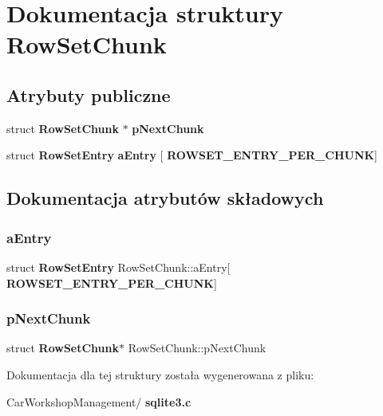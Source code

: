 \section{Dokumentacja struktury Row\+Set\+Chunk}
\label{struct_row_set_chunk}
\subsection*{Atrybuty publiczne}
\begin{DoxyCompactItemize}
\item 
struct \textbf{ Row\+Set\+Chunk} $\ast$ \textbf{ p\+Next\+Chunk}
\item 
struct \textbf{ Row\+Set\+Entry} \textbf{ a\+Entry} [\textbf{ R\+O\+W\+S\+E\+T\+\_\+\+E\+N\+T\+R\+Y\+\_\+\+P\+E\+R\+\_\+\+C\+H\+U\+NK}]
\end{DoxyCompactItemize}


\subsection{Dokumentacja atrybutów składowych}
\mbox{\label{struct_row_set_chunk_abde97bbb07c3bf9454e719ff860bdd1f}} 
\subsubsection{aEntry}
{\footnotesize\ttfamily struct \textbf{ Row\+Set\+Entry} Row\+Set\+Chunk\+::a\+Entry[\textbf{ R\+O\+W\+S\+E\+T\+\_\+\+E\+N\+T\+R\+Y\+\_\+\+P\+E\+R\+\_\+\+C\+H\+U\+NK}]}

\mbox{\label{struct_row_set_chunk_ae8f0975c86633ae2bb8b212d3a767554}} 
\subsubsection{pNextChunk}
{\footnotesize\ttfamily struct \textbf{ Row\+Set\+Chunk}$\ast$ Row\+Set\+Chunk\+::p\+Next\+Chunk}



Dokumentacja dla tej struktury została wygenerowana z pliku\+:\begin{DoxyCompactItemize}
\item 
Car\+Workshop\+Management/\textbf{ sqlite3.\+c}\end{DoxyCompactItemize}
